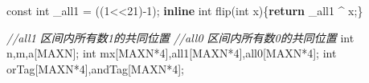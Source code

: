 \documentclass[
]{article}
\newenvironment{Shaded}{}{}
\newcommand{\AttributeTok}[1]{\textcolor[rgb]{0.49,0.56,0.16}{#1}}
\newcommand{\CommentTok}[1]{\textcolor[rgb]{0.38,0.63,0.69}{\textit{#1}}}
\newcommand{\ControlFlowTok}[1]{\textcolor[rgb]{0.00,0.44,0.13}{\textbf{#1}}}
\newcommand{\DataTypeTok}[1]{\textcolor[rgb]{0.56,0.13,0.00}{#1}}
\newcommand{\DecValTok}[1]{\textcolor[rgb]{0.25,0.63,0.44}{#1}}
\newcommand{\KeywordTok}[1]{\textcolor[rgb]{0.00,0.44,0.13}{\textbf{#1}}}
\newcommand{\NormalTok}[1]{#1}
\begin{document}
\begin{Shaded}
\begin{Highlighting}[]
\AttributeTok{const}  \DataTypeTok{int}\NormalTok{ \_all1 = ((}\DecValTok{1}\NormalTok{\textless{}\textless{}}\DecValTok{21}\NormalTok{){-}}\DecValTok{1}\NormalTok{);}
\KeywordTok{inline} \DataTypeTok{int}\NormalTok{ flip(}\DataTypeTok{int}\NormalTok{ x)\{}\ControlFlowTok{return}\NormalTok{  \_all1 \^{} x;\}}

\CommentTok{//all1 区间内所有数1的共同位置}
\CommentTok{//all0 区间内所有数0的共同位置}
\DataTypeTok{int}\NormalTok{ n,m,a[MAXN];}
\DataTypeTok{int}\NormalTok{ mx[MAXN*}\DecValTok{4}\NormalTok{],all1[MAXN*}\DecValTok{4}\NormalTok{],all0[MAXN*}\DecValTok{4}\NormalTok{];}
\DataTypeTok{int}\NormalTok{ orTag[MAXN*}\DecValTok{4}\NormalTok{],andTag[MAXN*}\DecValTok{4}\NormalTok{];}


\end{Highlighting}
\end{Shaded}
\end{document}
